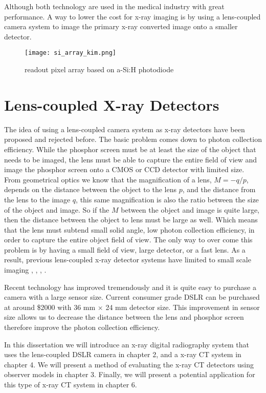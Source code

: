 Although both technology are used in the medical industry with great performance.  A way to lower the cost for x-ray imaging is by using a lens-coupled camera system to image the primary x-ray converted image onto a smaller detector.

\begin{figure}
\texttt{[image: si\_array\_kim.png]}
\label{fig:a-Si:H array}
\caption{readout pixel array based on a-Si:H photodiode}
\end{figure}

\section{Lens-coupled X-ray Detectors}
The idea of using a lens-coupled camera system as x-ray detectors have been proposed and rejected before.  The basic problem comes down to photon collection efficiency.  While the phosphor screen must be at least the size of the object that needs to be imaged, the lens must be able to capture the entire field of view and image the phosphor screen onto a CMOS or CCD detector with limited size.  From geometrical optics we know that the magnification of a lens, $M = -q/p$, depends on the distance between the object to the lens $p$, and the distance from the lens to the image $q$, this same magnification is also the ratio between the size of the object and image.  So if the $M$ between the object and image is quite large, then the distance between the object to lens must be large as well.  Which means that the lens must subtend small solid angle, low photon collection efficiency, in order to capture the entire object field of view.  The only way to over come this problem is by having a small field of view, large detector, or a fast lens.  As a result, previous lens-coupled x-ray detector systems have limited to small scale imaging \cite{kim2005}, \cite{lee2001}, \cite{tate2005}, \cite{madden2006}.  

Recent technology has improved tremendously and it is quite easy to purchase a camera with a large sensor size.  Current consumer grade DSLR can be purchased at around \$2000 with 36 mm $\times$ 24 mm detector size.  This improvement in sensor size allows us to decrease the distance between the lens and phosphor screen therefore improve the photon collection efficiency.

In this dissertation we will introduce an x-ray digital radiography system that uses the lens-coupled DSLR camera in chapter 2, and a x-ray CT system in chapter 4.  We will present a method of evaluating the x-ray CT detectors using observer models in chapter 3.  Finally, we will present a potential application for this type of x-ray CT system in chapter 6.
